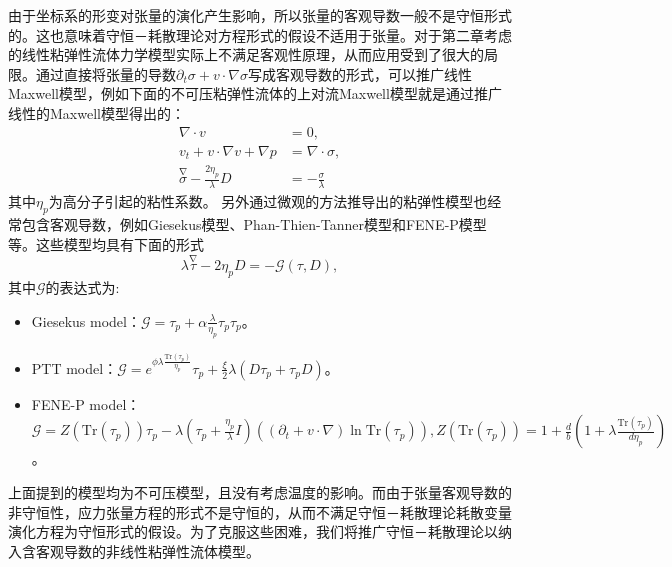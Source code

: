 由于坐标系的形变对张量的演化产生影响，所以张量的客观导数一般不是守恒形式的。这也意味着守恒－耗散理论对方程形式的假设不适用于张量。对于第二章考虑的线性粘弹性流体力学模型实际上不满足客观性原理，从而应用受到了很大的局限。通过直接将张量的导数$\partial_t \sigma  + v \cdot \nabla \sigma$写成客观导数的形式，可以推广线性Maxwell模型，例如下面的不可压粘弹性流体的上对流Maxwell模型就是通过推广线性的Maxwell模型得出的\cite{oldroyd1950formulation}：
\begin{subequations} \label{eq:UCM}
	\begin{align}
		\nabla \cdot v &= 0, \\
		v_t + v \cdot \nabla v + \nabla p  &= \nabla \cdot \sigma, \\
		\stackrel{\nabla} \sigma - \frac{2\eta_p}{\lambda} D &= - \frac{\sigma}{\lambda}
	\end{align}
\end{subequations}
其中$\eta_p$为高分子引起的粘性系数。
另外通过微观的方法推导出的粘弹性模型也经常包含客观导数，例如Giesekus模型、Phan-Thien-Tanner模型和FENE-P模型等。这些模型均具有下面的形式
\begin{equation*}
	\lambda \stackrel{\nabla} \tau  -2 \eta_p D = - \mathcal{G}(\tau,D),
\end{equation*}
其中$\mathcal{G}$的表达式为\cite{le2009multiscale}:
\begin{itemize}
\item Giesekus model：$\mathcal{G} = \tau_p + \alpha \frac{\lambda}{\eta_p} \tau_p\tau_p$。
\item PTT model：$\mathcal{G} = e^{\phi \lambda \frac{\mbox{Tr}(\tau_p)}{\eta_p}}\tau_p + \frac{\xi}{2} \lambda (D \tau_p + \tau_p D)$。
\item FENE-P model：$\mathcal{G}  = Z(\mbox{Tr}(\tau_p))\tau_p  -\lambda (\tau_p + \frac{\eta_p}{\lambda} I)\left( (\partial_t + v \cdot \nabla) \ln \mbox{Tr}(\tau_p) \right), Z(\mbox{Tr}(\tau_p)) = 1 + \frac{d}{b} (1+ \lambda \frac{\mbox{Tr}{(\tau_p)}}{d \eta_p})$。
\end{itemize}

上面提到的模型均为不可压模型，且没有考虑温度的影响。而由于张量客观导数的非守恒性，应力张量方程的形式不是守恒的，从而不满足守恒－耗散理论耗散变量演化方程为守恒形式的假设。为了克服这些困难，我们将推广守恒－耗散理论以纳入含客观导数的非线性粘弹性流体模型。

